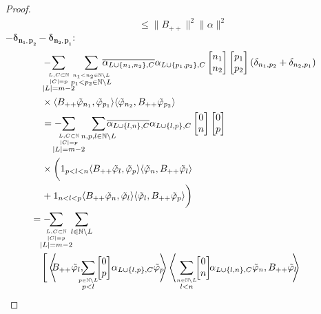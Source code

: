 \documentclass[b5paper,draft,openbib,12pt]{memoir}
\begin{document}
\begin{proof}
\begin{align}
  &\le \|B_{++}\|^2 \|\alpha\|^2
\end{align}
\(\boldsymbol{-\delta_{n_1,p_2}-\delta_{n_2,p_1}:}\)
\begin{align}
&-\hspace{-0.4cm}\sum_{\overset{L,C\subset \mathbb{N}}{\overset{|C|=p}{|L|=m-2}}}\hspace{-0.2cm}\sum_{\overset{n_1<n_2\in\mathbb{N}\backslash L }{p_1<p_2\in\mathbb{N}\backslash L }}
\hspace{-0.4cm}\overline{\alpha_{L\cup\{n_1,n_2\},C}}\alpha_{L\cup\{p_1,p_2\},C}
\left[\begin{matrix}n_1\\n_2\end{matrix}\right]\left[\begin{matrix}p_1\\p_2\end{matrix}\right](\delta_{n_1,p_2}+\delta_{n_2,p_1})\\
&\times 
\langle B_{++}\tilde{\varphi}_{n_1},\tilde{\varphi}_{p_1} \rangle \langle  \tilde{\varphi}_{n_2}, B_{++}\tilde{\varphi}_{p_2}\rangle\\
&=-\hspace{-0.4cm}\sum_{\overset{L,C\subset \mathbb{N}}{\overset{|C|=p}{|L|=m-2}}}\hspace{-0.2cm}\sum_{n,p,l\in\mathbb{N}\backslash L }
\hspace{-0.4cm}\overline{\alpha_{L\cup\{l,n\},C}}\alpha_{L\cup\{l,p\},C}
\left[\begin{matrix}0\\n\end{matrix}\right]\left[\begin{matrix}0\\p\end{matrix}\right]\\
&\times \bigg( 1_{p<l<n}
\langle B_{++}\tilde{\varphi}_{l},\tilde{\varphi}_{p} \rangle \langle  \tilde{\varphi}_{n}, B_{++}\tilde{\varphi}_{l}\rangle\\
&+1_{n<l<p}\langle B_{++}\tilde{\varphi}_{n},\tilde{\varphi}_{l} \rangle \langle  \tilde{\varphi}_{l}, B_{++}\tilde{\varphi}_{p}\rangle\bigg)\\
&\hspace{-0.4cm}=-\hspace{-0.4cm}\!\sum_{\overset{L,C\subset \mathbb{N}}{\overset{|C|=p}{|L|=m-2}}}\!\!\sum_{l\in\mathbb{N}\backslash L}\\
&\Bigg[\left\langle\!\!\! B_{++} \tilde{\varphi}_{l}, \!\!\!\!\sum_{\overset{p\in\mathbb{N}\backslash L}{p<l}}\!\!\left[\begin{matrix}0\\p\end{matrix}\right] \!\alpha_{L\cup\{l,p\},C}\tilde{\varphi}_p \!\!\!\right\rangle \left\langle \sum_{\overset{n\in\mathbb{N}\backslash L}{l<n}} \!\!\left[\begin{matrix}0\\n\end{matrix}\right]\!\!\alpha_{L\cup \{l,n\},C} \tilde{\varphi}_n,  B_{++} \tilde{\varphi}_l \!\!\!\right\rangle\\

\end{align}
\end{proof}
\end{document}
